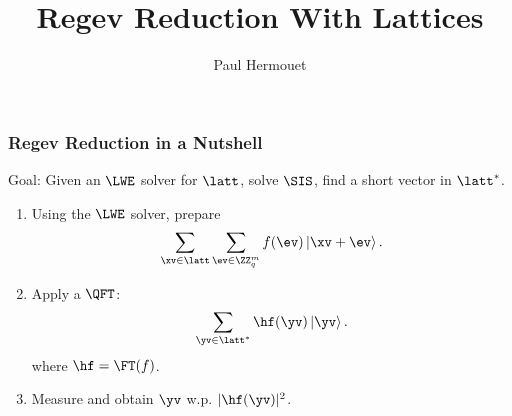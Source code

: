 \documentclass[aspectratio=169, dvipsnames, 10pt]{beamer}
\title{Regev Reduction With Lattices}
\date{}
\author{Paul Hermouet}
\begin{document}
\begin{frame}
  \frametitle{Regev Reduction in a Nutshell}

  Goal: Given an $\LWE$ solver for $\latt$, solve $\SIS$, \ie{} find a short vector in $\latt^*$.
  \pause\vfill

  \begin{minipage}{.45\textwidth}
    \begin{enumerate}
      \item Using the $\LWE$ solver, prepare
      $$
        \sum_{\xv \in \latt} \sum_{\ev \in \ZZ_q^m} f(\ev) \ket{\xv + \ev}.
      $$
      \item<3-> Apply a $\QFT$:
      $$
        \sum_{\yv \in \latt^*} \hf(\yv) \ket{\yv}.
      $$
      {\small where $\hf = \FT(f)$.}
      \item<5-> Measure and obtain $\yv$ w.p. $|\hf(\yv)|^2$.
    \end{enumerate}
  \end{minipage}
\end{frame}
\end{document}
